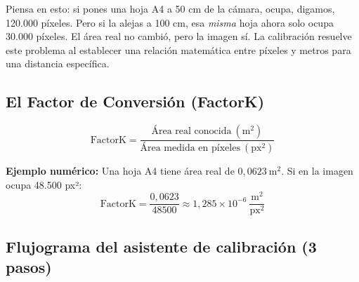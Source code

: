 \documentclass[12pt, a4paper]{article}
\begin{document}
Piensa en esto: si pones una hoja A4 a 50 cm de la cámara, ocupa, digamos, 120.000 píxeles.
Pero si la alejas a 100 cm, esa \textit{misma} hoja ahora solo ocupa 30.000 píxeles.
El área real no cambió, pero la imagen sí. La calibración resuelve este problema al establecer
una relación matemática entre píxeles y metros para una distancia específica.

\subsection{El Factor de Conversión (FactorK)}

\begin{formulabox}[title=Fórmula del FactorK]
\vspace{0.3cm}
$$\text{FactorK} = \frac{\text{Área real conocida}\ (\text{m}^2)}{\text{Área medida en píxeles}\ (\text{px}^2)}$$
\vspace{0.1cm}

\textbf{Ejemplo numérico:} Una hoja A4 tiene área real de $0{,}0623\ \text{m}^2$.
Si en la imagen ocupa 48.500 px²:
$$\text{FactorK} = \frac{0{,}0623}{48500} \approx 1{,}285 \times 10^{-6}\ \frac{\text{m}^2}{\text{px}^2}$$
\end{formulabox}

\subsection{Flujograma del asistente de calibración (3 pasos)}
\end{document}
